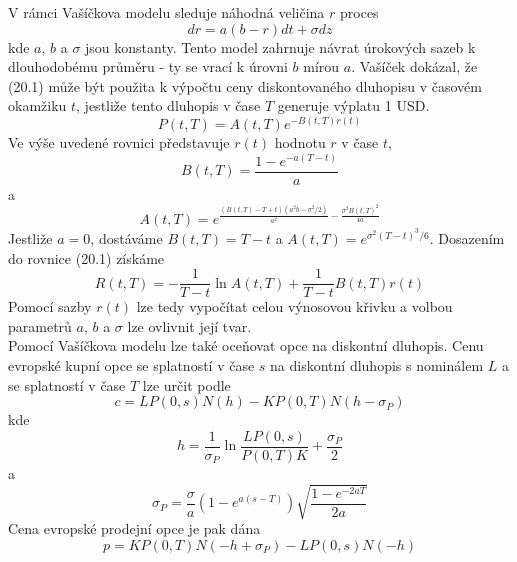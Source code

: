 \documentclass[a4paper]{book}
\begin{document}
V rámci Vašíčkova modelu sleduje náhodná veličina $r$ proces
\begin{equation}
dr = a(b-r)dt + \sigma dz
\end{equation}
kde $a$, $b$ a $\sigma$ jsou konstanty. Tento model zahrnuje návrat úrokových sazeb k dlouhodobému průměru - ty se vrací k úrovni $b$ mírou $a$. Vašíček dokázal, že (20.1) může být použita k výpočtu ceny diskontovaného dluhopisu v časovém okamžiku $t$, jestliže tento dluhopis v čase $T$ generuje výplatu 1 USD.
\begin{equation*}
P(t,T)=A(t,T)e^{-B(t,T)r(t)}
\end{equation*}
Ve výše uvedené rovnici představuje $r(t)$ hodnotu $r$ v čase $t$,
\begin{equation*}
B(t,T)= \frac{1-e^{-a(T-t)}}{a}
\end{equation*}
a
\begin{equation*}
A(t,T)=e^{\frac{(B(t,T)-T+t)(a^2b-\sigma^2/2)}{a^2}-\frac{\sigma^2B(t,T)^2}{4a}}
\end{equation*}
Jestliže $a=0$, dostáváme $B(t,T)=T-t$ a $A(t,T)=e^{\sigma^2(T-t)^3/6}$. Dosazením do rovnice (20.1) získáme
\begin{equation*}
R(t,T)=-\frac{1}{T-t}\ln A(t,T)+\frac{1}{T-t}B(t,T)r(t)
\end{equation*}
Pomocí sazby $r(t)$ lze tedy vypočítat celou výnosovou křivku a volbou parametrů $a$, $b$ a $\sigma$ lze ovlivnit její tvar.\\

Pomocí Vašíčkova modelu lze také oceňovat opce na diskontní dluhopis. Cenu evropské kupní opce se splatností v čase $s$ na diskontní dluhopis s nominálem $L$ a se splatností v čase $T$ lze určit podle
\begin{equation*}
c = L P(0,s)N(h)-K P(0,T) N(h - \sigma_P)
\end{equation*}
kde
\begin{equation*}
h = \frac{1}{\sigma_P} \ln \frac{L P(0,s)}{P(0, T)K} + \frac{\sigma_P}{2}
\end{equation*}
a
\begin{equation*}
\sigma_P = \frac{\sigma}{a}(1-e^{a(s-T)})\sqrt{\frac{1-e^{-2aT}}{2a}}
\end{equation*}
Cena evropské prodejní opce je pak dána
\begin{equation*}
p = KP(0,T)N(-h + \sigma_P) - L P(0,s)N(-h)
\end{equation*}
\end{document}
